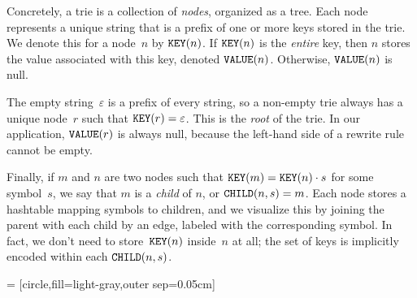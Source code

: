 \documentclass[../generics]{subfiles}
\begin{document}
Concretely, a trie is a collection of \emph{nodes}, organized as a tree. Each node represents a unique string that is a prefix of one or more keys stored in the trie.  We denote this for a node~$n$ by $\texttt{KEY}(n)$. If $\texttt{KEY}(n)$ is the \emph{entire} key, then $n$ stores the value associated with this key, denoted $\texttt{VALUE}(n)$. Otherwise, $\texttt{VALUE}(n)$ is null.

The empty string~$\varepsilon$ is a prefix of every string, so a non-empty trie always has a unique node~$r$ such that $\texttt{KEY}(r)=\varepsilon$. This is the \emph{root} of the trie. In our application, $\texttt{VALUE}(r)$ is always null, because the left-hand side of a rewrite rule cannot be empty.

Finally, if $m$ and $n$ are two nodes such that $\texttt{KEY}(m)=\texttt{KEY}(n)\cdot s$ for some symbol~$s$, we say that $m$ is a \emph{child} of $n$, or $\texttt{CHILD}(n,s)=m$. Each node stores a hashtable mapping symbols to children, and we visualize this by joining the parent with each child by an edge, labeled with the corresponding symbol. In fact, we don't need to store~$\texttt{KEY}(n)$ inside~$n$ at all; the set of keys is implicitly encoded within each $\texttt{CHILD}(n,s)$.

 = [circle,fill=light-gray,outer sep=0.05cm]
\end{document}
